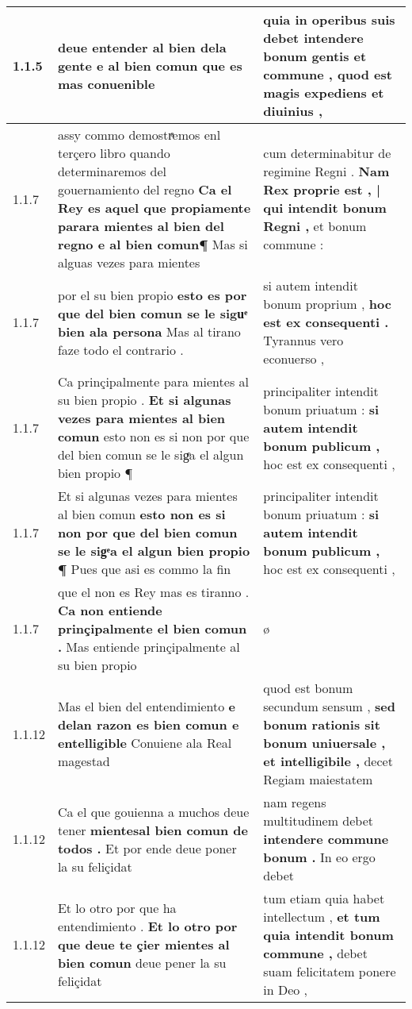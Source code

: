 \begin{tabular}{|p{1cm}|p{6.5cm}|p{6.5cm}|}

\hline
1.1.5 & deue entender al bien dela gente \textbf{ e al bien comun } que es mas conuenible & quia in operibus suis debet \textbf{ intendere bonum gentis et commune , } quod est magis expediens et diuinius , \\\hline
1.1.7 & assy commo demostrͣemos enl terçero libro quando determinaremos del gouernamiento del regno \textbf{ Ca el Rey es aquel que propiamente parara mientes al bien del regno e al bien comun¶ } Mas si alguas vezes para mientes & cum determinabitur de regimine Regni . \textbf{ Nam Rex proprie est , | qui intendit bonum Regni , } et bonum commune : \\\hline
1.1.7 & por el su bien propio \textbf{ esto es por que del bien comun se le siguͤ bien ala persona } Mas al tirano faze todo el contrario . & si autem intendit bonum proprium , \textbf{ hoc est ex consequenti . } Tyrannus vero econuerso , \\\hline
1.1.7 & Ca prinçipalmente para mientes al su bien propio . \textbf{ Et si algunas vezes para mientes al bien comun } esto non es si non por que del bien comun se le sigͤa el algun bien propio ¶ & principaliter intendit bonum priuatum : \textbf{ si autem intendit bonum publicum , } hoc est ex consequenti , \\\hline
1.1.7 & Et si algunas vezes para mientes al bien comun \textbf{ esto non es si non por que del bien comun se le sigͤa el algun bien propio ¶ } Pues que asi es commo la fin & principaliter intendit bonum priuatum : \textbf{ si autem intendit bonum publicum , } hoc est ex consequenti , \\\hline
1.1.7 & que el non es Rey mas es tiranno . \textbf{ Ca non entiende prinçipalmente el bien comun . } Mas entiende prinçipalmente al su bien propio & ø \\\hline
1.1.12 & Mas el bien del entendimiento \textbf{ e delan razon es bien comun e entelligible } Conuiene ala Real magestad & quod est bonum secundum sensum , \textbf{ sed bonum rationis sit bonum uniuersale , et intelligibile , } decet Regiam maiestatem \\\hline
1.1.12 & Ca el que gouienna a muchos deue tener \textbf{ mientesal bien comun de todos . } Et por ende deue poner la su feliçidat & nam regens multitudinem debet \textbf{ intendere commune bonum . } In eo ergo debet \\\hline
1.1.12 & Et lo otro por que ha entendimiento . \textbf{ Et lo otro por que deue te çier mientes al bien comun } deue pener la su feliçidat & tum etiam quia habet intellectum , \textbf{ et tum quia intendit bonum commune , } debet suam felicitatem ponere in Deo , \\\hline

\end{tabular}
